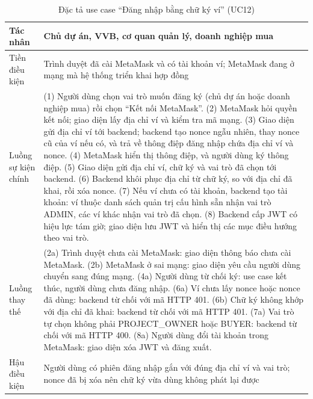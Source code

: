 \begin{table}[!htbp]
    \centering
    \caption{Đặc tả use case ``Đăng nhập bằng chữ ký ví'' (UC12)}
    \label{tab:dt-uc12}
    \small
    \begin{tabularx}{\textwidth}{|L{2.8cm}|Y|}
        \hline
        Tác nhân & Chủ dự án, VVB, cơ quan quản lý, doanh nghiệp mua \\
        \hline
        Tiền điều kiện & Trình duyệt đã cài MetaMask và có tài khoản ví; MetaMask đang ở mạng mà hệ thống triển khai hợp đồng \\
        \hline
        Luồng sự kiện chính & (1) Người dùng chọn vai trò muốn đăng ký (chủ dự án hoặc doanh nghiệp mua) rồi chọn ``Kết nối MetaMask''.\newline
        (2) MetaMask hỏi quyền kết nối; giao diện lấy địa chỉ ví và kiểm tra mã mạng.\newline
        (3) Giao diện gửi địa chỉ ví tới backend; backend tạo nonce ngẫu nhiên, thay nonce cũ của ví nếu có, và trả về thông điệp đăng nhập chứa địa chỉ ví và nonce.\newline
        (4) MetaMask hiển thị thông điệp, và người dùng ký thông điệp.\newline
        (5) Giao diện gửi địa chỉ ví, chữ ký và vai trò đã chọn tới backend.\newline
        (6) Backend khôi phục địa chỉ từ chữ ký, so với địa chỉ đã khai, rồi xóa nonce.\newline
        (7) Nếu ví chưa có tài khoản, backend tạo tài khoản: ví thuộc danh sách quản trị cấu hình sẵn nhận vai trò ADMIN, các ví khác nhận vai trò đã chọn.\newline
        (8) Backend cấp JWT có hiệu lực tám giờ; giao diện lưu JWT và hiển thị các mục điều hướng theo vai trò. \\
        \hline
        Luồng thay thế & (2a) Trình duyệt chưa cài MetaMask: giao diện thông báo chưa cài MetaMask.\newline
        (2b) MetaMask ở sai mạng: giao diện yêu cầu người dùng chuyển sang đúng mạng.\newline
        (4a) Người dùng từ chối ký: use case kết thúc, người dùng chưa đăng nhập.\newline
        (6a) Ví chưa lấy nonce hoặc nonce đã dùng: backend từ chối với mã HTTP 401.\newline
        (6b) Chữ ký không khớp với địa chỉ đã khai: backend từ chối với mã HTTP 401.\newline
        (7a) Vai trò tự chọn không phải PROJECT\_OWNER hoặc BUYER: backend từ chối với mã HTTP 400.\newline
        (8a) Người dùng đổi tài khoản trong MetaMask: giao diện xóa JWT và đăng xuất. \\
        \hline
        Hậu điều kiện & Người dùng có phiên đăng nhập gắn với đúng địa chỉ ví và vai trò; nonce đã bị xóa nên chữ ký vừa dùng không phát lại được \\
        \hline
    \end{tabularx}
\end{table}

